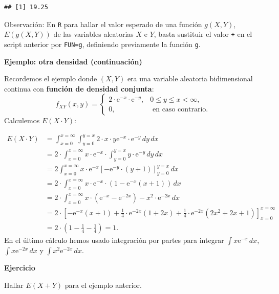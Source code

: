 \documentclass[]{book}
\begin{document}
\begin{verbatim}
## [1] 19.25
\end{verbatim}

Observación:
En \texttt{R} para hallar el valor esperado de una función \(g(X,Y)\), \(E(g(X,Y))\) de las variables aleatorias \(X\) e \(Y\), basta sustituir el valor \texttt{+} en el script anterior por \texttt{FUN=g}, definiendo previamente la función \texttt{g}.

\textbf{Ejemplo: otra densidad (continuación)}

Recordemos el ejemplo donde \((X,Y)\) era una variable aleatoria bidimensional continua con \textbf{función de densidad conjunta}:
\[
f_{XY}(x,y)=\begin{cases}
2\cdot \mathrm{e}^{-x}\cdot\mathrm{e}^{-y}, & 0\leq y\leq x < \infty,\\
0, & \mbox{ en caso contrario.}
\end{cases}
\]
Calculemos \(E(X\cdot Y)\):

\[
\begin{array}{rl}
E(X\cdot Y) & =\displaystyle \int_{x=0}^{x=\infty} \int_{y=0}^{y=x} 2\cdot x\cdot y \mathrm{e}^{-x}\cdot\mathrm{e}^{-y}\, dy\, dx\\
& =\displaystyle  2\cdot\int_{x=0}^{x=\infty} x \cdot\mathrm{e}^{-x} \cdot\int_{y=0}^{y=x}  y \cdot\mathrm{e}^{-y}\, dy\, dx\\
& =\displaystyle  2\int_{x=0}^{x=\infty}x\cdot \mathrm{e}^{-x} \left[-\mathrm{e}^{-y}\cdot (y+1)\right]_{y=0}^{y=x}\, dx\\
& =\displaystyle  2\cdot\int_{x=0}^{x=\infty}x \cdot\mathrm{e}^{-x} \cdot\left(1-\mathrm{e}^{-x}(x+1)\right)\, dx \\ 
&= \displaystyle 2\cdot\int_{x=0}^{x=\infty}x\cdot\left( \mathrm{e}^{-x}-\mathrm{e}^{-2x}\right)-x^2\cdot\mathrm{e}^{-2x}\, dx \\ 
& =\displaystyle  2\cdot\left[-\mathrm{e}^{-x}(x+1)+\frac{1}{4}\cdot\mathrm{e}^{-2 x}(1+2x)+\frac{1}{4} \cdot\mathrm{e}^{-2 x} \left(2 x^2+2
   x+1\right)\right]_{x=0}^{x=\infty} \\
   &= \displaystyle 2\cdot \left(1-\frac{1}{4}-\frac{1}{4}\right)=1.
\end{array}
\]
En el último cálculo hemos usado integración por partes para integrar \(\int x\mathrm{e}^{-x}\,dx\), \(\int x\mathrm{e}^{-2x}\,dx\) y \(\int x^2\mathrm{e}^{-2x}\, dx\).

\textbf{Ejercicio}

Hallar \(E(X+Y)\) para el ejemplo anterior.
\end{document}
